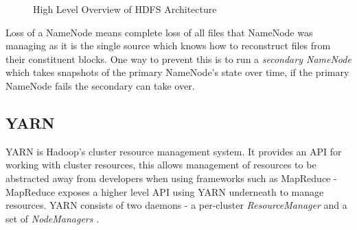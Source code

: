 \documentclass[conference]{IEEEtran}
\begin{document}
\begin{figure}[ht]
\centering
{}
\caption{High Level Overview of HDFS Architecture}
\label{clientread}
\end{figure}

Loss of a NameNode means complete loss of all files that NameNode was managing as it is the single source which knows how to reconstruct files from their constituent blocks. One way to prevent this is to run a \emph{secondary NameNode} \cite{secnamenode} which takes snapshots of the primary NameNode's state over time, if the primary NameNode fails the secondary can take over.

\subsection{YARN}
YARN is Hadoop's cluster resource management system. It provides an API for working with cluster resources, this allows management of resources to be abstracted away from developers when using frameworks such as MapReduce - MapReduce exposes a higher level API using YARN underneath to manage resources. YARN consists of two daemons - a per-cluster \emph{ResourceManager} and a set of \emph{NodeManagers} \cite{yarn}.
\end{document}
